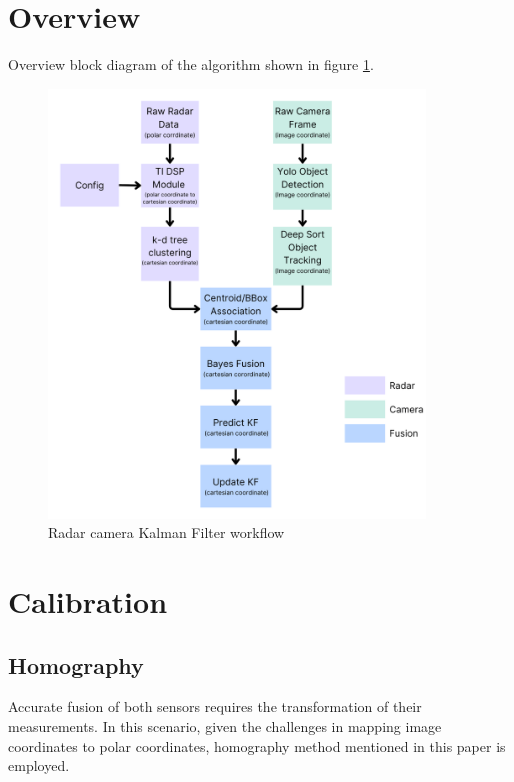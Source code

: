 \section{Overview}\label{sec:2-overview}
Overview block diagram of the algorithm shown in figure \ref*{fig:kf_update}.
\begin{figure}[hpbt]
    \centering
    \includegraphics[width=10cm]{Figures/kf_update-modified.png}%
    \caption{Radar camera Kalman Filter workflow}
    \label{fig:kf_update}
\end{figure}

\newpage
\section{Calibration}\label{sec:2-calibration}
\subsection{Homography}\label{subsec:2-1-Homography}
Accurate fusion of both sensors requires the transformation of their measurements. 
In this scenario, given the challenges in mapping image coordinates to polar coordinates, 
homography method mentioned in this paper \cite{KIM2014641} is employed.

